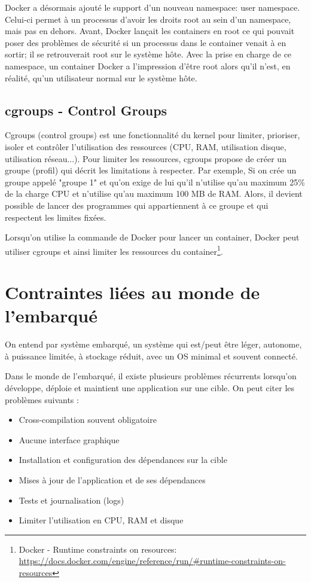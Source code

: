 Docker a désormais ajouté le support d'un nouveau namespace: user namespace. Celui-ci permet à un processus d'avoir les droits root au sein d'un namespace, mais pas en dehors. Avant, Docker lançait les containers en root ce qui pouvait poser des problèmes de sécurité si un processus dans le container venait à en sortir; il se retrouverait root sur le système hôte. Avec la prise en charge de ce namespace, un container Docker a l'impression d'être root alors qu'il n'est, en réalité, qu'un utilisateur normal sur le système hôte.

\subsection{cgroups - Control Groups}
Cgroups (control groups) est une fonctionnalité du kernel pour limiter, prioriser, isoler et contrôler l'utilisation des ressources (CPU, RAM, utilisation disque, utilisation réseau...). Pour limiter les ressources, cgroups propose de créer un groupe (profil) qui décrit les limitations à respecter. Par exemple, Si on crée un groupe appelé "groupe 1" et qu'on exige de lui qu'il n'utilise qu'au maximum 25\% de la charge CPU et n'utilise qu'au maximum 100 MB de RAM. Alors, il devient possible de lancer des programmes qui appartiennent à ce groupe et qui respectent les limites fixées.

Lorsqu'on utilise la commande  de Docker pour lancer un container, Docker peut utiliser cgroups et ainsi limiter les ressources du container\footnote{Docker - Runtime constraints on resources: \url{https://docs.docker.com/engine/reference/run/\#runtime-constraints-on-resources}}.

\section{Contraintes liées au monde de l'embarqué}\label{sec-contraintes-monde-embarque}
On entend par système embarqué, un système qui est/peut être léger, autonome, à puissance limitée, à stockage réduit, avec un OS minimal et souvent connecté.

Dans le monde de l'embarqué, il existe plusieurs problèmes récurrents lorsqu'on développe, déploie et maintient une application sur une cible. On peut citer les problèmes suivants :

\begin{itemize}
\item Cross-compilation souvent obligatoire
\item Aucune interface graphique
\item Installation et configuration des dépendances sur la cible
\item Mises à jour de l'application et de ses dépendances
\item Tests et journalisation (logs)
\item Limiter l'utilisation en CPU, RAM et disque
\end{itemize}

